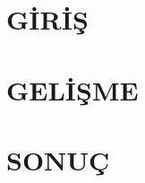 \documentclass[12pt,a4paper]{article} %
\begin{document}

\setlength\parindent{1cm}




\setlength\parindent{0cm}

\section{GİRİŞ}
\blindtext
\clearpage

\section{GELİŞME}
\blindtext
\clearpage

\section{SONUÇ}
\blindtext
\cite{Armand2006,Arora2008,Bahlmann2002}
\clearpage



\end{document}
